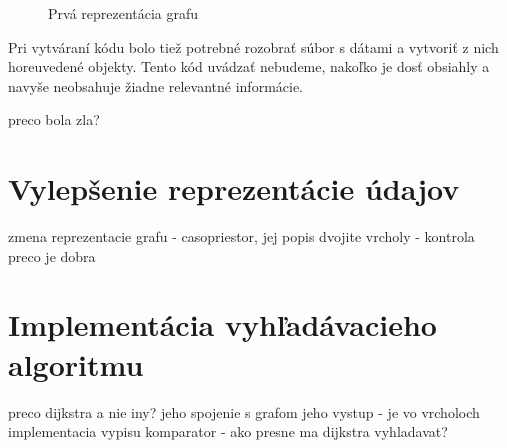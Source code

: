\begin{figure}[H]
  \caption{Prvá reprezentácia grafu}
  \label{1_Graph}
\end{figure}

Pri vytváraní kódu bolo tiež potrebné rozobrať súbor s dátami a vytvoriť z nich horeuvedené objekty. Tento kód uvádzať nebudeme, nakoľko je dosť obsiahly a navyše neobsahuje žiadne relevantné informácie.\newline

preco bola zla?


\section{Vylepšenie reprezentácie údajov}

zmena reprezentacie grafu - casopriestor, jej popis
dvojite vrcholy - kontrola
preco je dobra


\section{Implementácia vyhľadávacieho algoritmu}

preco dijkstra a nie iny?
jeho spojenie s grafom
jeho vystup - je vo vrcholoch
implementacia vypisu
komparator - ako presne ma dijkstra vyhladavat?